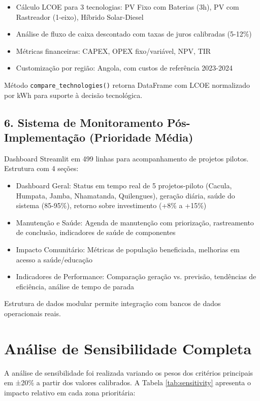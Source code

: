 \documentclass[12pt, a4paper]{article}
\begin{document}
\begin{itemize}
    \item Cálculo LCOE para 3 tecnologias: PV Fixo com Baterias (3h), PV com Rastreador (1-eixo), Híbrido Solar-Diesel
    \item Análise de fluxo de caixa descontado com taxas de juros calibradas (5-12\%)
    \item Métricas financeiras: CAPEX, OPEX fixo/variável, NPV, TIR
    \item Customização por região: Angola, com custos de referência 2023-2024
\end{itemize}

Método \texttt{compare\_technologies()} retorna DataFrame com LCOE normalizado por kWh para suporte à decisão tecnológica.

\subsection{6. Sistema de Monitoramento Pós-Implementação (Prioridade Média)}

Dashboard Streamlit em 499 linhas para acompanhamento de projetos pilotos. Estrutura com 4 seções:

\begin{itemize}
    \item Dashboard Geral: Status em tempo real de 5 projetos-piloto (Cacula, Humpata, Jamba, Nhamatanda, Quilengues), geração diária, saúde do sistema (85-95\%), retorno sobre investimento (+8\% a +15\%)
    \item Manutenção e Saúde: Agenda de manutenção com priorização, rastreamento de conclusão, indicadores de saúde de componentes
    \item Impacto Comunitário: Métricas de população beneficiada, melhorias em acesso a saúde/educação
    \item Indicadores de Performance: Comparação geração vs. previsão, tendências de eficiência, análise de tempo de parada
\end{itemize}

Estrutura de dados modular permite integração com bancos de dados operacionais reais.

\appendix

\section{Análise de Sensibilidade Completa}

A análise de sensibilidade foi realizada variando os pesos dos critérios principais em ±20\% a partir dos valores calibrados. A Tabela \ref{tab:sensitivity} apresenta o impacto relativo em cada zona prioritária:
\end{document}
